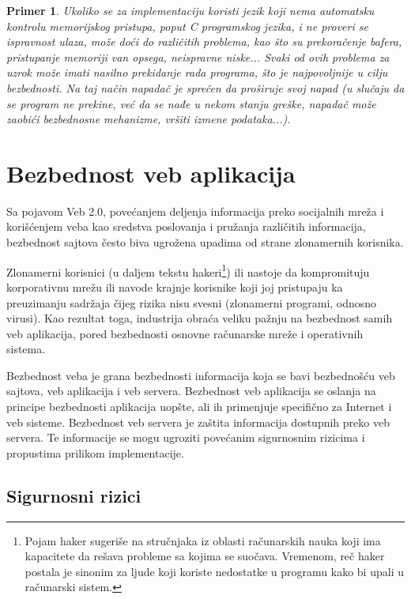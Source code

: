 \documentclass[a4paper]{article}
\newtheorem{primer}{Primer}[section]
\begin{document}
\begin{primer}
	\label{primer5}
	Ukoliko se za implementaciju koristi jezik koji nema automatsku kontrolu memorijskog pristupa, poput C programskog jezika, i ne proveri se ispravnost ulaza, može doći do različitih problema, kao što su prekoračenje bafera, pristupanje memoriji van opsega, neispravne niske... Svaki od ovih problema za uzrok može imati nasilno prekidanje rada programa, što je najpovoljnije u cilju bezbednosti. Na taj način napadač je sprečen da proširuje svoj napad (u slučaju da se program ne prekine, već da se nađe u nekom stanju greške, napadač može zaobići bezbednosne mehanizme, vršiti izmene podataka...).
\end{primer}

\section{Bezbednost veb aplikacija} \label{aplikacije}

Sa pojavom Veb 2.0, povećanjem deljenja informacija preko socijalnih mreža i korišćenjem veba kao sredstva poslovanja i pružanja različitih informacija, bezbednost sajtova često biva ugrožena upadima od strane zlonamernih korisnika.

Zlonamerni korisnici (u daljem tekstu hakeri\footnote{Pojam haker sugeriše na stručnjaka iz oblasti računarskih nauka koji ima kapacitete da rešava probleme sa kojima se suočava. Vremenom, reč haker postala je sinonim za ljude koji koriste nedostatke u programu kako bi upali u računarski sistem.}) ili nastoje da kompromituju korporativnu mrežu ili navode krajnje korisnike koji joj pristupaju ka preuzimanju sadržaja čijeg rizika nisu svesni (zlonamerni programi, odnosno virusi). Kao rezultat toga, industrija obraća veliku pažnju na bezbednost samih veb aplikacija, pored bezbednosti osnovne računarske mreže i operativnih sistema.

Bezbednost veba je grana bezbednosti informacija koja se bavi bezbednošću veb sajtova, veb aplikacija i veb servera. Bezbednost veb aplikacija se oslanja na principe bezbednosti aplikacija uopšte, ali ih primenjuje specifično za Internet i veb sisteme.
Bezbednost veb servera je zaštita informacija dostupnih preko veb servera. Te informacije se mogu ugroziti povećanim sigurnosnim rizicima i propustima prilikom implementacije.

\subsection{Sigurnosni rizici}
\end{document}
